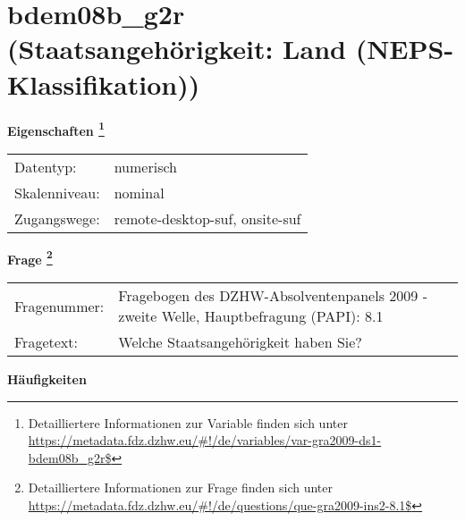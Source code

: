 
    \setcounter{footnote}{0}

    \vspace*{-1.8cm}
	\section{bdem08b\_g2r (Staatsangehörigkeit: Land (NEPS-Klassifikation))}
	\label{section:bdem08b_g2r}



    \vspace*{0.5cm}
    \noindent\textbf{Eigenschaften
	\footnote{Detailliertere Informationen zur Variable finden sich unter
		\url{https://metadata.fdz.dzhw.eu/\#!/de/variables/var-gra2009-ds1-bdem08b_g2r$}}}\\
	\begin{tabularx}{\hsize}{@{}lX}
	Datentyp: & numerisch \\
	Skalenniveau: & nominal \\
	Zugangswege: &
	  remote-desktop-suf, 
	  onsite-suf
 \\
    \end{tabularx}



				\vspace*{0.5cm}
                \noindent\textbf{Frage
	                \footnote{Detailliertere Informationen zur Frage finden sich unter
		              \url{https://metadata.fdz.dzhw.eu/\#!/de/questions/que-gra2009-ins2-8.1$}}}\\
				\begin{tabularx}{\hsize}{@{}lX}
					Fragenummer: &
					  Fragebogen des DZHW-Absolventenpanels 2009 - zweite Welle, Hauptbefragung (PAPI):
					  8.1
 \\
					Fragetext: & Welche Staatsangehörigkeit haben Sie? \\
				\end{tabularx}





        		\vspace*{0.5cm}
                \noindent\textbf{Häufigkeiten}

